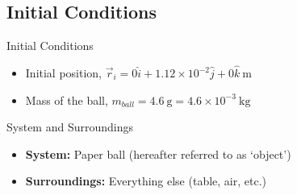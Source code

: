 





\subsection{Initial Conditions}
\begin{frame}{Initial Conditions}
	\begin{itemize}
	\item Initial position, \(\vec{r}_i = 0\hat{i} + 1.12\times 10^{-2} \hat{j} + 0\hat{k}\ \mathrm{m} \)
	\item Mass of the ball, \(m_{ball} = 4.6\ \mathrm{g} = 4.6 \times 10^{-3}\ \mathrm{kg}\)
	\end{itemize}
\end{frame}

\begin{frame}{System and Surroundings}
	\begin{itemize}
	\item \textbf{System:} Paper ball (hereafter referred to as `object')
	\item \textbf{Surroundings:} Everything else (table, air, etc.)
	\end{itemize}
\end{frame}

